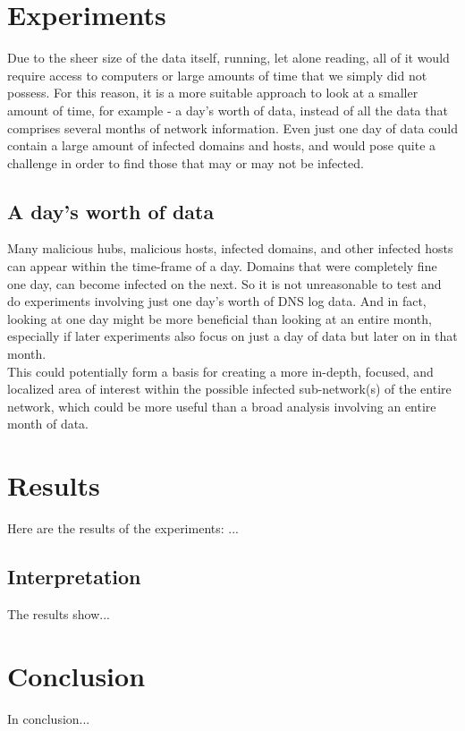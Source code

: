 \documentclass{article} %
\begin{document}
\section{Experiments}
\label{exp}
Due to the sheer size of the data itself, running, let alone reading, all of it would require access to computers or large amounts of time that we simply did not possess. For this reason, it is a more suitable approach to 
look at a smaller amount of time, for example - a day's worth of data, instead of all the data that comprises several months of network information. Even just one day of data could contain a large amount of infected domains 
and hosts, and would pose quite a challenge in order to find those that may or may not be infected.

\subsection{A day's worth of data}
Many malicious hubs, malicious hosts, infected domains, and other infected hosts can appear within the time-frame of a day. Domains that were completely fine one day, can become infected on the next. So it is not unreasonable to test
and do experiments involving just one day's worth of DNS log data. And in fact, looking at one day might be more beneficial than looking at an entire month, especially if later experiments also focus on just a day of data but later on 
in that month. \\
This could potentially form a basis for creating a more in-depth, focused, and localized area of interest within the possible infected sub-network(s) of the entire network, which could be more useful than a broad analysis
involving an entire month of data.

\section{Results}
\label{res}
Here are the results of the experiments:
...

\subsection{Interpretation}
The results show... 


\section{Conclusion}
\label{conclusion}
In conclusion...
\end{document}

